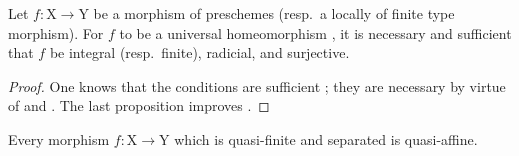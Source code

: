 \begin{corollary}[18.12.11]
\label{IV.18.12.11}
Let $f:\mathrm{X}\to\mathrm{Y}$ be a morphism of preschemes (resp.\ a locally of finite type morphism).
For $f$ to be a universal homeomorphism , it is necessary and sufficient that $f$ be integral (resp.\ finite), radicial, and surjective.
\end{corollary}

\begin{proof}
One knows that the conditions are sufficient ; they are necessary by virtue of  and .
The last proposition improves .
\end{proof}

\begin{proposition}[18.12.12]
\label{IV.18.12.12}
Every morphism $f:\mathrm{X}\to\mathrm{Y}$ which is quasi-finite and separated is quasi-affine.
\end{proposition}


